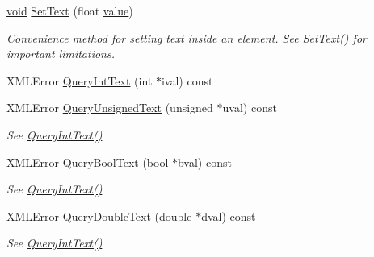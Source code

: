 \begin{DoxyCompactItemize}
\mbox{\label{classtinyxml2_1_1_x_m_l_element_a51d560da5ae3ad6b75e0ab9ffb2ae42a}} 
\hyperlink{interfacevoid}{void} \hyperlink{classtinyxml2_1_1_x_m_l_element_a51d560da5ae3ad6b75e0ab9ffb2ae42a}{Set\+Text} (float \hyperlink{unionvalue}{value})
\begin{DoxyCompactList}\small\item\em Convenience method for setting text inside an element. See \hyperlink{classtinyxml2_1_1_x_m_l_element_a1f9c2cd61b72af5ae708d37b7ad283ce}{Set\+Text()} for important limitations. \end{DoxyCompactList}\item 
X\+M\+L\+Error \hyperlink{classtinyxml2_1_1_x_m_l_element_a926357996bef633cb736e1a558419632}{Query\+Int\+Text} (int $\ast$ival) const
\item 
\mbox{\label{classtinyxml2_1_1_x_m_l_element_a14d38aa4b5e18a46274a27425188a6a1}} 
X\+M\+L\+Error \hyperlink{classtinyxml2_1_1_x_m_l_element_a14d38aa4b5e18a46274a27425188a6a1}{Query\+Unsigned\+Text} (unsigned $\ast$uval) const
\begin{DoxyCompactList}\small\item\em See \hyperlink{classtinyxml2_1_1_x_m_l_element_a926357996bef633cb736e1a558419632}{Query\+Int\+Text()} \end{DoxyCompactList}\item 
\mbox{\label{classtinyxml2_1_1_x_m_l_element_a3fe5417d59eb8f5c4afe924b7d332736}} 
X\+M\+L\+Error \hyperlink{classtinyxml2_1_1_x_m_l_element_a3fe5417d59eb8f5c4afe924b7d332736}{Query\+Bool\+Text} (bool $\ast$bval) const
\begin{DoxyCompactList}\small\item\em See \hyperlink{classtinyxml2_1_1_x_m_l_element_a926357996bef633cb736e1a558419632}{Query\+Int\+Text()} \end{DoxyCompactList}\item 
\mbox{\label{classtinyxml2_1_1_x_m_l_element_a684679c99bb036a25652744cec6c4d96}} 
X\+M\+L\+Error \hyperlink{classtinyxml2_1_1_x_m_l_element_a684679c99bb036a25652744cec6c4d96}{Query\+Double\+Text} (double $\ast$dval) const
\begin{DoxyCompactList}\small\item\em See \hyperlink{classtinyxml2_1_1_x_m_l_element_a926357996bef633cb736e1a558419632}{Query\+Int\+Text()} \end{DoxyCompactList}\item 

\end{DoxyCompactItemize}
